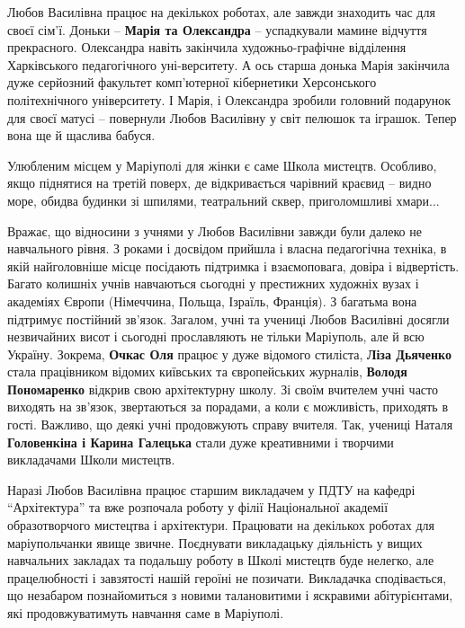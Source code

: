 
Любов Василівна працює на декількох роботах, але завжди знаходить час для своєї
сім'ї. Доньки – \textbf{Марія та Олександра} – успадкували мамине відчуття прекрасного.
Олександра навіть закінчила художньо-графічне відділення Харківського
педагогічного уні\hyp{}верситету. А ось старша донька Марія закінчила дуже серйозний
факультет комп'ютерної кібернетики Херсонського політехнічного університету. І
Марія, і Олександра зробили головний подарунок для своєї матусі – повернули
Любов Василівну у світ пелюшок та іграшок. Тепер вона ще й щаслива бабуся.


Улюбленим місцем у Маріуполі для жінки є саме Школа мистецтв. Особливо, якщо
піднятися на третій поверх, де відкривається чарівний краєвид – видно море,
обидва будинки зі шпилями, театральний сквер, приголомшливі хмари...


Вражає, що відносини з учнями у Любов Василівни завжди були далеко не
навчального рівня. З роками і досвідом прийшла і власна педагогічна техніка, в
якій найголовніше місце посідають підтримка і взаємоповага, довіра і
відвертість. Багато колишніх учнів навчаються сьогодні у престижних художніх
вузах і академіях Європи (Німеччина, Польща, Ізраїль, Франція). З багатьма вона
підтримує постійний зв'язок. Загалом, учні та учениці Любов Василівні досягли
незвичайних висот і сьогодні прославляють не тільки Маріуполь, але й всю
Україну. Зокрема, \textbf{Очкас Оля} працює у дуже відомого стиліста, \textbf{Ліза Дьяченко}
стала працівником відомих київських та європейських журналів, \textbf{Володя
Пономаренко} відкрив свою архітектурну школу. Зі своїм вчителем учні часто
виходять на зв'язок, звертаються за порадами, а коли є можливість, приходять в
гості. Важливо, що деякі учні продовжують справу вчителя. Так, учениці Наталя
\textbf{Головенкіна і Карина Галецька} стали дуже креативними і творчими викладачами
Школи мистецтв.


Наразі Любов Василівна працює старшим викладачем у ПДТУ на кафедрі
\enquote{Архітектура} та вже розпочала роботу у філії Національної академії
образотворчого мистецтва і архітектури. Працювати на декількох роботах для
маріупольчанки явище звичне. Поєднувати викладацьку діяльність у вищих
навчальних закладах та подальшу роботу в Школі мистецтв буде нелегко, але
працелюбності і завзятості нашій героїні не позичати. Викладачка сподівається,
що незабаром познайомиться з новими талановитими і яскравими абітурієнтами, які
продовжуватимуть навчання саме в Маріуполі.

